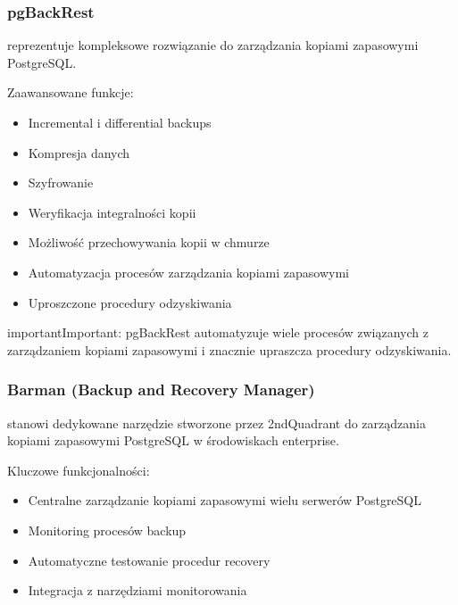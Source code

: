 \documentclass[a4paper,11pt,openany,english]{sphinxmanual}
\begin{document}
\subsubsection{pgBackRest}
\label{\detokenize{rozdzial2/Kopie_zapasowe_i_odzyskiwanie_danych/kopie_zapasowe_i_odzyskiwanie_danych:pgbackrest}}
\sphinxAtStartPar
{} reprezentuje kompleksowe rozwiązanie do zarządzania kopiami zapasowymi PostgreSQL.

\sphinxAtStartPar
Zaawansowane funkcje:
\begin{itemize}
\item {} 
\sphinxAtStartPar
Incremental i differential backups

\item {} 
\sphinxAtStartPar
Kompresja danych

\item {} 
\sphinxAtStartPar
Szyfrowanie

\item {} 
\sphinxAtStartPar
Weryfikacja integralności kopii

\item {} 
\sphinxAtStartPar
Możliwość przechowywania kopii w chmurze

\item {} 
\sphinxAtStartPar
Automatyzacja procesów zarządzania kopiami zapasowymi

\item {} 
\sphinxAtStartPar
Uproszczone procedury odzyskiwania

\end{itemize}

\begin{sphinxadmonition}{important}{Important:}
\sphinxAtStartPar
pgBackRest automatyzuje wiele procesów związanych z zarządzaniem kopiami zapasowymi i znacznie upraszcza procedury odzyskiwania.
\end{sphinxadmonition}


\subsubsection{Barman (Backup and Recovery Manager)}
\label{\detokenize{rozdzial2/Kopie_zapasowe_i_odzyskiwanie_danych/kopie_zapasowe_i_odzyskiwanie_danych:barman-backup-and-recovery-manager}}
\sphinxAtStartPar
{} stanowi dedykowane narzędzie stworzone przez 2ndQuadrant do zarządzania kopiami zapasowymi PostgreSQL w środowiskach enterprise.

\sphinxAtStartPar
Kluczowe funkcjonalności:
\begin{itemize}
\item {} 
\sphinxAtStartPar
Centralne zarządzanie kopiami zapasowymi wielu serwerów PostgreSQL

\item {} 
\sphinxAtStartPar
Monitoring procesów backup

\item {} 
\sphinxAtStartPar
Automatyczne testowanie procedur recovery

\item {} 
\sphinxAtStartPar
Integracja z narzędziami monitorowania

\end{itemize}
\end{document}
